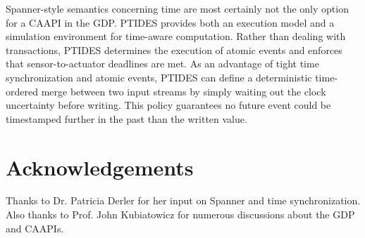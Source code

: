 \documentclass[10pt,twocolumn]{article}
\begin{document}
Spanner-style semantics concerning time are most certainly not the only option for a CAAPI in the GDP. PTIDES \cite{zou_execution_2009} provides both an execution model and a simulation environment for time-aware computation. Rather than dealing with transactions, PTIDES determines the execution of atomic events and enforces that sensor-to-actuator deadlines are met. As an advantage of tight time synchronization and atomic events, PTIDES can define a deterministic time-ordered merge between two input streams by simply waiting out the clock uncertainty before writing. This policy guarantees no future event could be timestamped further in the past than the written value.







\section{Acknowledgements}
Thanks to Dr. Patricia Derler for her input on Spanner and time synchronization. Also thanks to Prof. John Kubiatowicz for numerous discussions about the GDP and CAAPIs.



\end{document}
